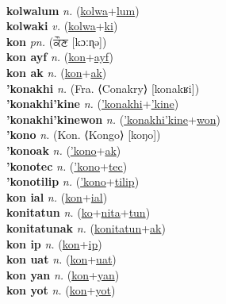  \label{kolwalon} \\
\textbf{kolwalum} \textit{n.} (\hyperref[kolwa]{kolwa}+\hyperref[lum]{lum})
 \label{kolwalum} \\
\textbf{kolwaki} \textit{v.} (\hyperref[kolwa]{kolwa}+\hyperref[ki]{ki})
 \label{kolwaki} \\
\textbf{kon} \textit{pn.} ({\gurmukhi{}ਕੌਣ} [kɔːɳə])
 \label{kon} \\
\textbf{kon ayf} \textit{n.} (\hyperref[kon]{kon}+\hyperref[ayf]{ayf})
 \label{kon ayf} \\
\textbf{kon ak} \textit{n.} (\hyperref[kon]{kon}+\hyperref[ak]{ak})
 \label{kon ak} \\
\textbf{'konakhi} \textit{n.} (Fra. ⟨Conakry⟩ [konakʁi])
 \label{'konakhi} \\
\textbf{'konakhi'kine} \textit{n.} (\hyperref['konakhi]{'konakhi}+\hyperref['kine]{'kine})
 \label{'konakhi'kine} \\
\textbf{'konakhi'kinewon} \textit{n.} (\hyperref['konakhi'kine]{'konakhi'kine}+\hyperref[won]{won})
 \label{'konakhi'kinewon} \\
\textbf{'kono} \textit{n.} (Kon. ⟨Kongo⟩ [koŋo])
 \label{'kono} \\
\textbf{'konoak} \textit{n.} (\hyperref['kono]{'kono}+\hyperref[ak]{ak})
 \label{'konoak} \\
\textbf{'konotec} \textit{n.} (\hyperref['kono]{'kono}+\hyperref[tec]{tec})
 \label{'konotec} \\
\textbf{'konotilip} \textit{n.} (\hyperref['kono]{'kono}+\hyperref[tilip]{tilip})
 \label{'konotilip} \\
\textbf{kon ial} \textit{n.} (\hyperref[kon]{kon}+\hyperref[ial]{ial})
 \label{kon ial} \\
\textbf{konitatun} \textit{n.} (\hyperref[ko]{ko}+\hyperref[nita]{nita}+\hyperref[tun]{tun})
 \label{konitatun} \\
\textbf{konitatunak} \textit{n.} (\hyperref[konitatun]{konitatun}+\hyperref[ak]{ak})
 \label{konitatunak} \\
\textbf{kon ip} \textit{n.} (\hyperref[kon]{kon}+\hyperref[ip]{ip})
 \label{kon ip} \\
\textbf{kon uat} \textit{n.} (\hyperref[kon]{kon}+\hyperref[uat]{uat})
 \label{kon uat} \\
\textbf{kon yan} \textit{n.} (\hyperref[kon]{kon}+\hyperref[yan]{yan})
 \label{kon yan} \\
\textbf{kon yot} \textit{n.} (\hyperref[kon]{kon}+\hyperref[yot]{yot})
 \label{kon yot} \\
